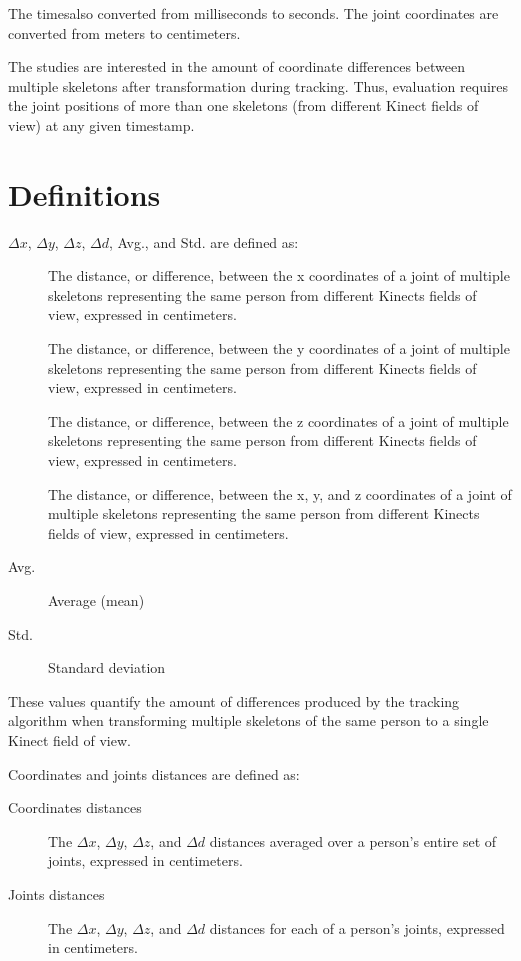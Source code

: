 The timesalso converted from milliseconds to seconds. The joint coordinates are converted from meters to centimeters.

The studies are interested in the amount of coordinate differences between multiple skeletons after transformation during tracking. Thus, evaluation requires the joint positions of more than one skeletons (from different Kinect fields of view) at any given timestamp.

\section{Definitions}
\label{sec:results_definitions}

$\Delta x$, $\Delta y$, $\Delta z$, $\Delta d$, Avg., and Std. are defined as:

\begin{description}
  \item[] The distance, or difference, between the x coordinates of a joint of multiple skeletons representing the same person from different Kinects fields of view, expressed in centimeters.
  \item[] The distance, or difference, between the y coordinates of a joint of multiple skeletons representing the same person from different Kinects fields of view, expressed in centimeters.
  \item[] The distance, or difference, between the z coordinates of a joint of multiple skeletons representing the same person from different Kinects fields of view, expressed in centimeters.
  \item[] The distance, or difference, between the x, y, and z coordinates of a joint of multiple skeletons representing the same person from different Kinects fields of view, expressed in centimeters.
  \item[Avg.] Average (mean)
  \item[Std.] Standard deviation
\end{description}

These values quantify the amount of differences produced by the tracking algorithm when transforming multiple skeletons of the same person to a single Kinect field of view.

Coordinates and joints distances are defined as:

\begin{description}
  \item[Coordinates distances] The $\Delta x$, $\Delta y$, $\Delta z$, and $\Delta d$ distances averaged over a person's entire set of joints, expressed in centimeters.
  \item[Joints distances] The $\Delta x$, $\Delta y$, $\Delta z$, and $\Delta d$ distances for each of a person's joints, expressed in centimeters. 
\end{description}

